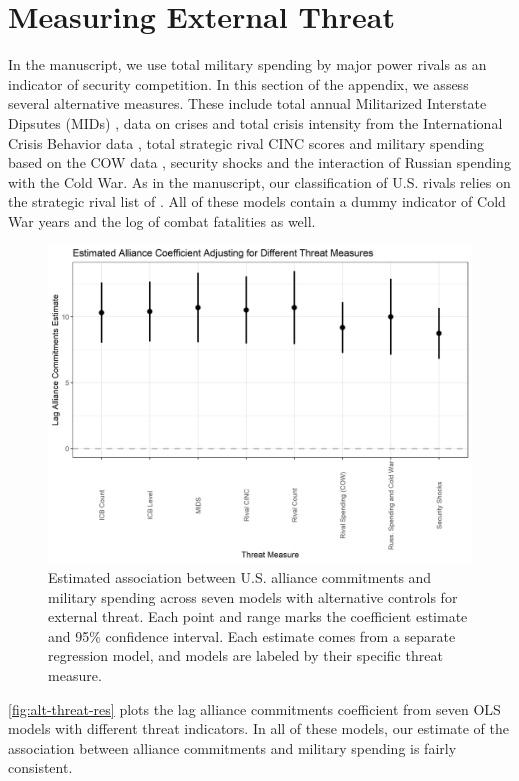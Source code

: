 \documentclass[12pt]{article}
\begin{document}
\section{Measuring External Threat}

In the manuscript, we use total military spending by major power rivals as an indicator of security competition. 
In this section of the appendix, we assess several alternative measures. 
These include total annual Militarized Interstate Dipsutes (MIDs) \citep{Gibleretal2016}, data on crises and total crisis intensity from the International Crisis Behavior data \citep{BrecherWilkenfield2000}, total strategic rival CINC scores and military spending based on the COW data \citep{SingerCINC1988}, security shocks \citep{Oatley2015} and the interaction of Russian spending with the Cold War. 
As in the manuscript, our classification of U.S. rivals relies on the strategic rival list of \citep{ThompsonDreyer2012}. 
All of these models contain a dummy indicator of Cold War years and the log of combat fatalities as well. 


\begin{figure} 
\includegraphics[width = .95\textwidth]{alt-threat-res.png}
\caption{Estimated association between U.S. alliance commitments and military spending across seven models with alternative controls for external threat.
Each point and range marks the coefficient estimate and 95\% confidence interval. 
Each estimate comes from a separate regression model, and models are labeled by their specific threat measure. }
\label{fig:alt-threat-res}
\end{figure}


\autoref{fig:alt-threat-res} plots the lag alliance commitments coefficient from seven OLS models with different threat indicators. 
In all of these models, our estimate of the association between alliance commitments and military spending is fairly consistent. 
\end{document}
